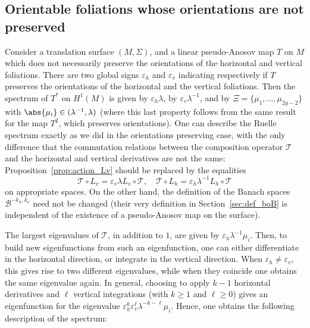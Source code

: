 \documentclass[11pt, a4paper, oneside, final, pagebackref]{amsart}
\newcommand{\boB}{\mathcal{B}}
\newcommand{\boT}{\mathcal{T}}
\renewcommand{\epsilon}{\varepsilon}
\renewcommand{\geq}{\geqslant}
\theoremstyle{definition}
\numberwithin{equation}{section}
\begin{document}
\subsection{Orientable foliations whose orientations are not preserved}
\label{subsec:orientable_foliations}

Consider a translation surface $(M,\Sigma)$, and a linear pseudo-Anosov map
$T$ on $M$ which does not necessarily preserve the orientations of the
horizontal and vertical foliations. There are two global signs $\epsilon_h$
and $\epsilon_v$ indicating respectively if $T$ preserves the orientations of
the horizontal and the vertical foliations. Then the spectrum of $T^*$ on
$H^1(M)$ is given by $\epsilon_h \lambda$, by $\epsilon_v \lambda^{-1}$, and
by $\Xi = \{\mu_1,\dotsc, \mu_{2g-2}\}$ with $\abs{\mu_i} \in (\lambda^{-1},
\lambda)$ (where this last property follows from the same result for the map
$T^2$, which preserves orientations). One can describe the Ruelle spectrum
exactly as we did in the orientations preserving case, with the only
difference that the commutation relations between the composition operator
$\boT$ and the horizontal and vertical derivatives are not the same:
Proposition~\ref{prop:action_Lv} should be replaced by the equalities
\begin{equation*}
  \boT \circ L_v = \epsilon_v \lambda L_v \circ \boT,
  \quad
  \boT \circ L_h = \epsilon_h \lambda^{-1} L_h \circ \boT
\end{equation*}
on appropriate spaces. On the other hand, the definition of the Banach spaces
$\boB^{-k_h, k_v}$ need not be changed (their very definition in
Section~\ref{sec:def_boB} is independent of the existence of a pseudo-Anosov
map on the surface).

The largest eigenvalues of $\boT$, in addition to $1$, are given by
$\epsilon_h \lambda^{-1} \mu_i$. Then, to build new eigenfunctions from such
an eigenfunction, one can either differentiate in the horizontal direction,
or integrate in the vertical direction. When $\epsilon_h \neq \epsilon_v$,
this gives rise to two different eigenvalues, while when they coincide one
obtains the same eigenvalue again. In general, choosing to apply $k-1$
horizontal derivatives and $\ell$ vertical integrations (with $k \geq 1$ and
$\ell \geq 0$) gives an eigenfunction for the eigenvalue $\epsilon_h^k
\epsilon_v^\ell \lambda^{-k-\ell}\mu_i$. Hence, one obtains the following
description of the spectrum:
\end{document}
